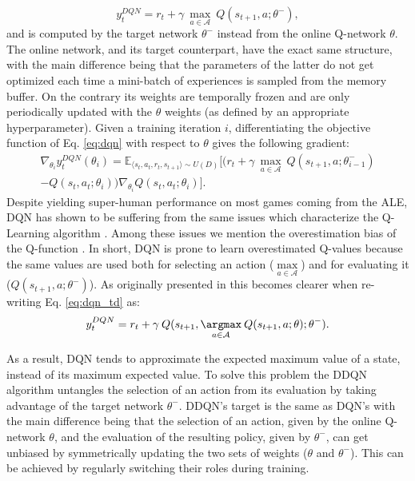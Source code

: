 \begin{equation}
    y^{DQN}_{t} = r_{t} + \gamma \: \underset{a\in \mathcal{A}}{\max}\: Q(s_{t+1}, a; \theta^{-}), 
\label{eq:dqn_td}
\end{equation}{}
and is computed by the target network $\theta^{-}$ instead from the online Q-network $\theta$. 
The online network, and its target counterpart, have the exact same structure, with the main difference being that the parameters of the latter do not get optimized each time a mini-batch of experiences is sampled from the memory buffer. On the contrary its weights are temporally frozen and are only periodically updated with the $\theta$ weights (as defined by an appropriate hyperparameter). Given a training iteration $i$, differentiating the objective function of Eq. \ref{eq:dqn} with respect to $\theta$ gives the following gradient: 
\begin{multline}
\nabla_{\theta_{i}}y^{DQN}_{t}(\theta_{i}) = \mathds{E}_{\langle s_{t},a_{t},r_{t},s_{t+1}\rangle\sim U(D)} \bigg[\big(r_{t} + \gamma \: \underset{a\in \mathcal{A}}{\max}\: Q(s_{t+1}, a; \theta^{-}_{i-1}) \\ - Q(s_{t}, a_{t}; \theta_{i})\big)\nabla_{\theta_{i}} Q(s_{t}, a_{t}; \theta_{i})\bigg].
\label{eq:dqn_gradient}
\end{multline}
Despite yielding super-human performance on most games coming from the ALE, DQN has shown to be suffering from the same issues which characterize the Q-Learning algorithm \cite{hasselt2010double}. Among these issues we mention the overestimation bias of the Q-function \cite{hasselt2010double}.
In short, DQN is prone to learn overestimated Q-values because the same values are used both for selecting an action ($\underset{a\in \mathcal{A}}{\max}$) and for evaluating it ($Q(s_{t+1},a;\theta^{-})$). As originally presented in \cite{van2016deep} this becomes clearer when re-writing Eq. \ref{eq:dqn_td} as:
\begin{equation}
    y^{DQN}_{t} = r_{t} + \gamma \: Q(s_{t+1}, \underset{a\in \mathcal{A}}{\argmax}\: Q(s_{t+1}, a; \theta); \theta^{-}). 
\end{equation}{}

As a result, DQN tends to approximate the expected maximum value of a state, instead of its maximum expected value. To solve this problem the DDQN algorithm untangles the selection of an action from its evaluation by taking advantage of the target network $\theta^{-}$. DDQN's target is the same as DQN's with the main difference being that the selection of an action, given by the online Q-network $\theta$, and the evaluation of the resulting policy, given by $\theta^{-}$, can get unbiased by symmetrically updating the two sets of weights ($\theta$ and $\theta^{-}$). This can be achieved by regularly switching their roles during training.

